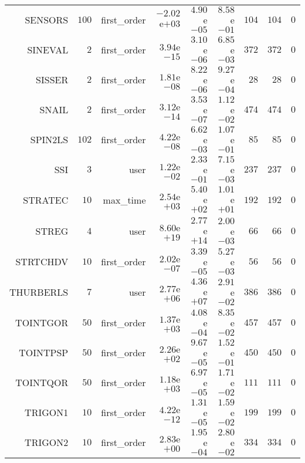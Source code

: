 \begin{longtable}{rrrrrrrrr}
SENSORS & \(   100\) & first\_order & \(-2.02\)e\(+03\) & \( 4.90\)e\(-05\) & \( 8.58\)e\(-01\) & \(   104\) & \(   104\) & \(     0\) \\
SINEVAL & \(     2\) & first\_order & \( 3.94\)e\(-15\) & \( 3.10\)e\(-06\) & \( 6.85\)e\(-03\) & \(   372\) & \(   372\) & \(     0\) \\
SISSER & \(     2\) & first\_order & \( 1.81\)e\(-08\) & \( 8.22\)e\(-06\) & \( 9.27\)e\(-04\) & \(    28\) & \(    28\) & \(     0\) \\
SNAIL & \(     2\) & first\_order & \( 3.12\)e\(-14\) & \( 3.53\)e\(-07\) & \( 1.12\)e\(-02\) & \(   474\) & \(   474\) & \(     0\) \\
SPIN2LS & \(   102\) & first\_order & \( 4.22\)e\(-08\) & \( 6.62\)e\(-03\) & \( 1.07\)e\(-01\) & \(    85\) & \(    85\) & \(     0\) \\
SSI & \(     3\) & user & \( 1.22\)e\(-02\) & \( 2.33\)e\(-01\) & \( 7.15\)e\(-03\) & \(   237\) & \(   237\) & \(     0\) \\
STRATEC & \(    10\) & max\_time & \( 2.54\)e\(+03\) & \( 5.40\)e\(+02\) & \( 1.01\)e\(+01\) & \(   192\) & \(   192\) & \(     0\) \\
STREG & \(     4\) & user & \( 8.60\)e\(+19\) & \( 2.77\)e\(+14\) & \( 2.00\)e\(-03\) & \(    66\) & \(    66\) & \(     0\) \\
STRTCHDV & \(    10\) & first\_order & \( 2.02\)e\(-07\) & \( 3.39\)e\(-05\) & \( 5.27\)e\(-03\) & \(    56\) & \(    56\) & \(     0\) \\
THURBERLS & \(     7\) & user & \( 2.77\)e\(+06\) & \( 4.36\)e\(+07\) & \( 2.91\)e\(-02\) & \(   386\) & \(   386\) & \(     0\) \\
TOINTGOR & \(    50\) & first\_order & \( 1.37\)e\(+03\) & \( 4.08\)e\(-04\) & \( 8.35\)e\(-02\) & \(   457\) & \(   457\) & \(     0\) \\
TOINTPSP & \(    50\) & first\_order & \( 2.26\)e\(+02\) & \( 9.67\)e\(-05\) & \( 1.52\)e\(-01\) & \(   450\) & \(   450\) & \(     0\) \\
TOINTQOR & \(    50\) & first\_order & \( 1.18\)e\(+03\) & \( 6.97\)e\(-05\) & \( 1.71\)e\(-02\) & \(   111\) & \(   111\) & \(     0\) \\
TRIGON1 & \(    10\) & first\_order & \( 4.22\)e\(-12\) & \( 1.31\)e\(-05\) & \( 1.59\)e\(-02\) & \(   199\) & \(   199\) & \(     0\) \\
TRIGON2 & \(    10\) & first\_order & \( 2.83\)e\(+00\) & \( 1.95\)e\(-04\) & \( 2.80\)e\(-02\) & \(   334\) & \(   334\) & \(     0\) \\

\end{longtable}
